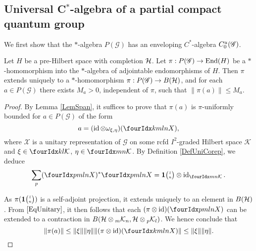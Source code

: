 \subsection{Universal C$^*$-algebra of a partial compact quantum group}

We first show that the $*$-algebra $P(\mathscr{G})$ has an enveloping $C^{*}$-algebra $\CuG$. 

\begin{Lem}\label{LemUniBound}
 Let $H$ be a pre-Hilbert space with completion $\Hsp$. Let $\pi: P(\mathscr{G})\rightarrow \End(H)$ be a $*$-homomorphism into the $*$-algebra of adjointable endomorphisms of $H$. Then $\pi$ extends uniquely to a $*$-homomorphism $\pi: P(\mathscr{G})\rightarrow B(\Hsp)$, and for each $a\in P(\mathscr{G})$ there exists $M_a>0$, independent of $\pi$, such that $\|\pi(a)\|\leq M_a$.
\end{Lem} 

\begin{proof}
By Lemma \ref{LemSpan}, it suffices to prove that $\pi(a)$ is $\pi$-uniformly bounded for $a\in P(\mathscr{G})$ of the form \[a=(\id \otimes \omega_{\xi,\eta})(\Gr{X}{k}{l}{m}{n}),\]
where $\mathscr{X}$ is a unitary representation of
$\mathscr{G}$ on some rcfd $I^{2}$-graded Hilbert space
$\mathcal{K}$ and $\xi\in \Gru{\mathcal{K}}{k}{l}$, $\eta\in
\Gru{\mathcal{K}}{m}{n}$.  By Definition \ref{DefUniCorep}, we deduce
  \begin{equation}\label{EqUnitary}
    \sum_{p}(\Gr{X}{p}{l}{m}{n})^{*} \Gr{X}{p}{l}{m}{n}  = \UnitC{l}{n}
    \otimes \id_{\Gru{\mathcal{K}}{m}{n}}.
  \end{equation}

As $\pi(\UnitC{l}{n})$ is a self-adjoint projection, it extends uniquely to an element in $B(\Hsp)$. From  $\eqref{EqUnitary}$, it then follows that each $(\pi\otimes \id)(\Gr{X}{p}{l}{m}{n})$ can be extended to a contraction in $B(\Hsp\otimes \GrDA{\mathcal{K}}{m}{n},\Hsp\otimes \GrDA{\mathcal{K}}{p}{l})$. We hence conclude that
 \[\|\pi(a)\| \leq \| \xi\| \|\eta\| \|(\pi \otimes \id)(\Gr{X}{k}{l}{m}{n})\| \leq
    \|\xi\|\|\eta\| .\] 

\end{proof} 


